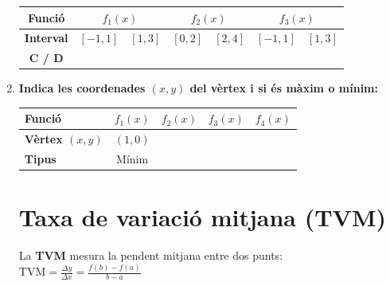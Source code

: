 \documentclass[12pt,a4paper]{article}
\begin{document}
\begin{enumerate}[label=\textbf{\arabic*.}]
    \begin{center}
    \renewcommand{\arraystretch}{1.3}
    \small
    \begin{tabular}{|c|c|c|c|c|c|c|}
        \hline
        \textbf{Funció} & \multicolumn{2}{c|}{$f_1(x)$} & \multicolumn{2}{c|}{$f_2(x)$} & \multicolumn{2}{c|}{$f_3(x)$} \\ \hline
        \textbf{Interval} & $[-1, 1]$ & $[1, 3]$ & $[0, 2]$ & $[2, 4]$ & $[-1, 1]$ & $[1, 3]$ \\ \hline
        \textbf{C / D} & & & & & & \\ \hline
    \end{tabular}
    \end{center}

    \item \textbf{Indica les coordenades $(x,y)$ del vèrtex i si és màxim o mínim:}
    
    \begin{center}
    \renewcommand{\arraystretch}{1.3}
    \begin{tabular}{|l|c|c|c|c|}
        \hline
        \textbf{Funció} & $f_1(x)$ & $f_2(x)$ & $f_3(x)$ & $f_4(x)$ \\ \hline
        \textbf{Vèrtex $(x,y)$} & $(1,0)$ & \hspace{2cm} & \hspace{2cm} & \hspace{2cm} \\ \hline
        \textbf{Tipus} & Mínim & & & \\ \hline
    \end{tabular}
    \end{center}

    \section*{Taxa de variació mitjana (TVM)}
    
    La \textbf{TVM} mesura la pendent mitjana entre dos punts: 
    $ \text{TVM} = \frac{\Delta y}{\Delta x} = \frac{f(b)-f(a)}{b-a} $


\end{enumerate}
\end{document}
